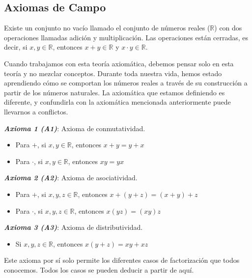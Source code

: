 \documentclass{report}
\begin{document}
    \subsection{Axiomas de Campo}

    Existe un conjunto no vacío llamado el conjunto de números reales ($\mathbb{R}$) con dos operaciones llamadas adición y multiplicación. Las operaciones están cerradas, es decir, si $x,y \in \mathbb{R}$, entonces $x+y \in \mathbb{R}$ y $x\cdot y \in \mathbb{R}$.

    \begin{noteBox}
        Cuando trabajamos con esta teoría axiomática, debemos pensar solo en esta teoría y no mezclar conceptos. Durante toda nuestra vida, hemos estado aprendiendo cómo se comportan los números reales a través de su construcción a partir de los números naturales. La axiomática que estamos definiendo es diferente, y confundirla con la axiomática mencionada anteriormente puede llevarnos a conflictos.
    \end{noteBox}

    \begin{axBox}
        \textit{\textbf{Axioma 1 (A1)}}: Axioma de conmutatividad.
        \begin{itemize}
            \item Para $+$, si $x,y \in \mathbb{R}$, entonces $x+y = y+x$
            \item Para $\cdot$, si $x,y \in \mathbb{R}$, entonces $xy = yx$
        \end{itemize}
    \end{axBox}

    \begin{axBox}
        \textit{\textbf{Axioma 2 (A2)}}: Axioma de asociatividad.
        \begin{itemize}
            \item Para $+$, si $x,y,z \in \mathbb{R}$, entonces $x+(y+z) = (x+y) + z$
            \item Para $\cdot$, si $x,y,z \in \mathbb{R}$, entonces $x(yz) = (xy)z$
        \end{itemize}
    \end{axBox}

    \begin{axBox}
        \textit{\textbf{Axioma 3 (A3)}}: Axioma de distributividad.
        \begin{itemize}
            \item Si $x,y,z \in \mathbb{R}$, entonces $x(y+z) = xy + xz$
        \end{itemize}
        \begin{noteBox}
            Este axioma por sí solo permite los diferentes casos de factorización que todos conocemos. Todos los casos se pueden deducir a partir de aquí.
        \end{noteBox}
    \end{axBox}
\end{document}
